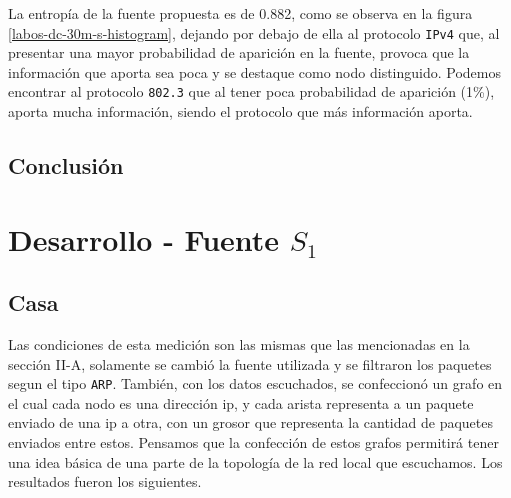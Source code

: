\documentclass[final,inline,a4paper,narroweqnarray]{ieee}
\begin{document}
  La entropía de la fuente propuesta es de 0.882, como se observa en la
  figura \ref{labos-dc-30m-s-histogram}, dejando por debajo de ella al
  protocolo \texttt{IPv4} que, al presentar una mayor probabilidad de
  aparición en la fuente, provoca que la información que aporta sea
  poca y se destaque como nodo distinguido. Podemos encontrar al protocolo 
  \texttt{802.3} que al tener poca probabilidad de aparición
  (1\%), aporta mucha información, siendo el protocolo que más información
  aporta.

    \subsection{Conclusión}




\section{Desarrollo - Fuente $S_1$}
  \subsection{Casa}

  Las condiciones de esta medición son las mismas que las mencionadas en la
  sección II-A, solamente se cambió la fuente utilizada y se filtraron los
  paquetes segun el tipo \texttt{ARP}.
  También, con los datos escuchados, se confeccionó un grafo en el cual cada
  nodo es una dirección ip, y cada arista representa a un paquete enviado de
  una ip a otra, con un grosor que representa la cantidad de paquetes
  enviados entre estos. Pensamos que la confección de estos grafos permitirá
  tener una idea básica de una parte de la topología de la red local que
  escuchamos. Los resultados fueron los siguientes.
\end{document}
